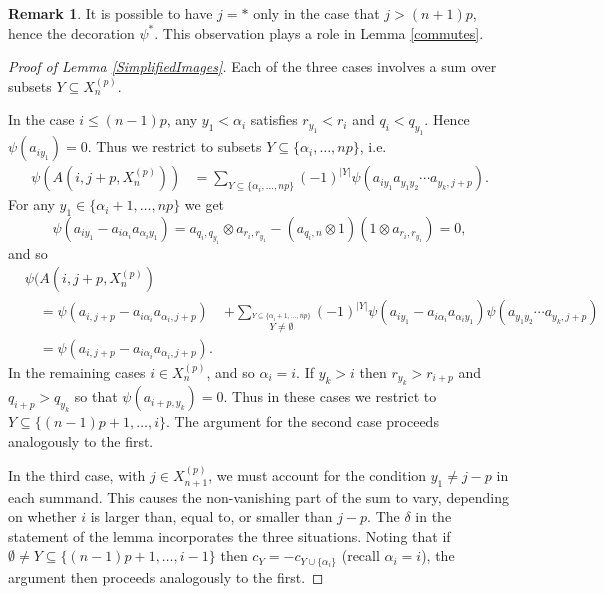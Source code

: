 \documentclass[11pt]{amsart}
\def\a{\alpha}
\theoremstyle{definition}
\newtheorem{rem}[thm]{Remark}
\begin{document}
\begin{rem}It is possible to have $j=\ast$ only in the case that $j>(n+1)p$, hence the decoration $\psi^\ast$. This observation plays a role in Lemma \ref{commutes}.
\end{rem}
\begin{proof}[Proof of Lemma \ref{SimplifiedImages}] Each of the three cases involves a sum over subsets $Y\subseteq X_n^{(p)}$. 

In the case $i\le(n-1)p$, any $y_1<\a_i$ satisfies $r_{y_1}<r_i$ and $q_i<q_{y_1}$. Hence $\psi(a_{iy_1})=0$. Thus we restrict to subsets $Y\subseteq\{\a_i,\ldots,np\}$, i.e.
        \begin{align*}
        \psi(A(i,j+p,X_n^{(p)}))  &= \sum_{Y\subseteq \{\a_i,\ldots,np\}}(-1)^{|Y|}\psi(a_{iy_1}a_{y_1y_2}\cdots a_{y_k,j+p}).
        \end{align*}
For any $y_1\in\{\a_i+1,\ldots,np\}$ we get 
{\small
  \[\psi(a_{iy_1}-a_{i\a_i}a_{\a_iy_1}) = a_{q_i,q_{y_1}}\otimes a_{r_i,r_{y_1}}-(a_{q_i,n}\otimes 1)(1\otimes a_{r_i,r_{y_1}}) = 0,\]
}
\noindent and so 
{\small
        \begin{align*}
          &\psi(A(i,j+p,X_n^{(p)})                  & \\
          &\quad =\psi(a_{i,j+p}-a_{i\a_i}a_{\a_i,j+p}) &+\sum_{{\scriptscriptstyle \overset{Y\subseteq \{\a_i+1,\ldots,np\}}{Y\ne\emptyset}}}(-1)^{|Y|}\psi(a_{iy_1}-a_{i\a_i}a_{\a_iy_1})\psi(a_{y_1y_2}\cdots a_{y_k,j+p})\\
          &\quad =\psi(a_{i,j+p}-a_{i\a_i}a_{\a_i,j+p}).
        \end{align*}
}
In the remaining cases $i\in X_n^{(p)}$, and so $\a_i=i$. If $y_k>i$ then $r_{y_k}>r_{i+p}$ and $q_{i+p}>q_{y_k}$ so that $\psi(a_{i+p,y_k})=0$. Thus in these cases we restrict to $Y\subseteq\{(n-1)p+1,\ldots,i\}$. The argument for the second case proceeds analogously to the first.

In the third case, with $j\in X_{n+1}^{(p)}$, we must account for the condition $y_1\ne j-p$ in each summand. This causes the non-vanishing part of the sum to vary, depending on whether $i$ is larger than, equal to, or smaller than $j-p$. The $\delta$ in the statement of the lemma incorporates the three situations.  Noting that if $\emptyset \ne Y\subseteq\{(n-1)p+1,\ldots,i-1\}$ then $c_Y = -c_{Y\cup \{\a_i\}}$ (recall $\a_i=i$), the argument then proceeds analogously to the first.
\end{proof}
\end{document}
